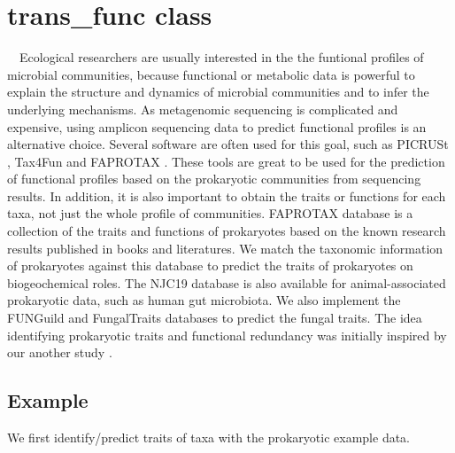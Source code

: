 \documentclass[
]{book}
\newenvironment{Shaded}{\begin{snugshade}}{\end{snugshade}}
\newcommand{\AttributeTok}[1]{\textcolor[rgb]{0.77,0.63,0.00}{#1}}
\newcommand{\CommentTok}[1]{\textcolor[rgb]{0.56,0.35,0.01}{\textit{#1}}}
\newcommand{\FunctionTok}[1]{\textcolor[rgb]{0.00,0.00,0.00}{#1}}
\newcommand{\NormalTok}[1]{#1}
\newcommand{\OtherTok}[1]{\textcolor[rgb]{0.56,0.35,0.01}{#1}}
\newcommand{\SpecialCharTok}[1]{\textcolor[rgb]{0.00,0.00,0.00}{#1}}
\newcommand{\StringTok}[1]{\textcolor[rgb]{0.31,0.60,0.02}{#1}}
\begin{document}
\hypertarget{trans_func-class}{%
\section{trans\_func class}\label{trans_func-class}}

　Ecological researchers are usually interested in the the funtional profiles of microbial communities,
because functional or metabolic data is powerful to explain the structure and dynamics of microbial communities and to infer the underlying mechanisms.
As metagenomic sequencing is complicated and expensive, using amplicon sequencing data to predict functional profiles is an alternative choice.
Several software are often used for this goal, such as PICRUSt \citep{Langille_Predictive_2013}, Tax4Fun \citep{Aßhauer_Tax4Fun_2015} and FAPROTAX \citep{Louca_High_2016, Louca_Decoupling_2016}.
These tools are great to be used for the prediction of functional profiles based on the prokaryotic communities from sequencing results.
In addition, it is also important to obtain the traits or functions for each taxa, not just the whole profile of communities.
FAPROTAX database is a collection of the traits and functions of prokaryotes based on the known research results published in books and literatures.
We match the taxonomic information of prokaryotes against this database to predict the traits of prokaryotes on biogeochemical roles.
The NJC19 database \citep{Lim_Large_2020} is also available for animal-associated prokaryotic data, such as human gut microbiota.
We also implement the FUNGuild \citep{Nguyen_FUNGuild_2016} and FungalTraits \citep{Polme_FungalTraits_2020} databases to predict the fungal traits.
The idea identifying prokaryotic traits and functional redundancy was initially inspired by our another study \citep{Liu_Microbial_2022}.

\hypertarget{example-8}{%
\subsection{Example}\label{example-8}}

We first identify/predict traits of taxa with the prokaryotic example data.

\begin{Shaded}
\end{Shaded}
\end{document}

